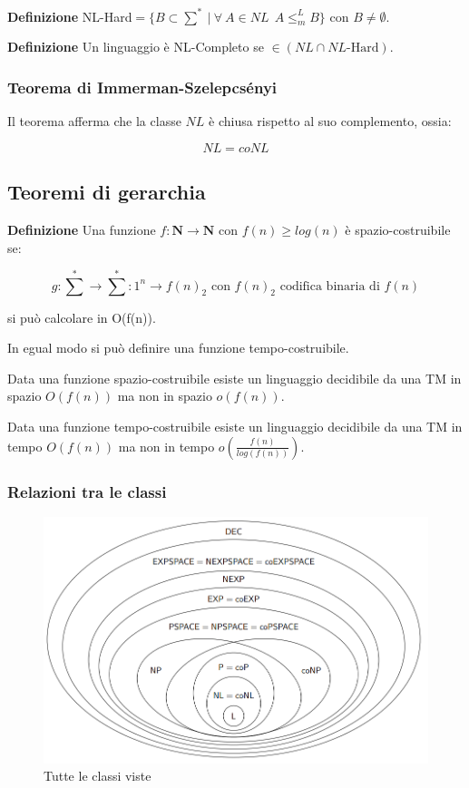 \documentclass{article}
\begin{document}
\textbf{Definizione} NL-Hard$=\{B\subset\sum^*\ |\ \forall\ A\in NL\ \ A\leq_m^L B\}$ con $B\neq\emptyset$.\newline

\noindent\textbf{Definizione} Un linguaggio è NL-Completo se $\in(NL\cap NL\text{-Hard})$.\newline

\subsubsection{Teorema di Immerman-Szelepcsényi}

Il teorema afferma che la classe $NL$ è chiusa rispetto al suo complemento, ossia:

$$NL=coNL$$\newline

\subsection{Teoremi di gerarchia}

\textbf{Definizione} Una funzione $f:\mathbf{N}\rightarrow\mathbf{N}$ con $f(n)\geq log(n)$ è spazio-costruibile se:

$$g:{\sum}^*\rightarrow{\sum}^*:1^n\rightarrow f(n)_2 \text{ con $f(n)_2$ codifica binaria di $f(n)$}$$\newline

\noindent si può calcolare in O(f(n)).\newline

\noindent In egual modo si può definire una funzione tempo-costruibile.\newline

\noindent Data una funzione spazio-costruibile esiste un linguaggio decidibile da una TM in spazio $O(f(n))$ ma non in spazio $o(f(n))$.\newline

\noindent Data una funzione tempo-costruibile esiste un linguaggio decidibile da una TM in tempo $O(f(n))$ ma non in tempo $o(\frac{f(n)}{log(f(n))})$.\newline

\newpage

\subsubsection{Relazioni tra le classi}

\begin{figure}[ht]
    \centering
    \includegraphics[width=\linewidth]{classi.png}
    \caption{Tutte le classi viste}
    \label{fig:classi}
\end{figure}
\end{document}

